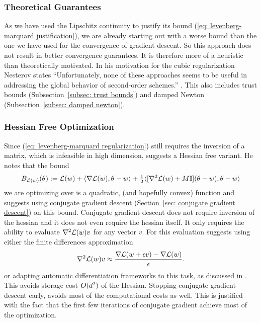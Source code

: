 \subsubsection{Theoretical Guarantees}

As we have used the Lipschitz continuity to justify its bound (\ref{eq:
levenberg-marquard justification}), we are already starting out with a worse
bound than the one we have used for the convergence of gradient descent. So
this approach does not result in better convergence guarantees. It is
therefore more of a heuristic than theoretically motivated. In his motivation
for the cubic regularization Nesterov states ``Unfortunately,
none of these approaches seems to be useful in addressing the global behavior of
second-order schemes.'' \parencite[p. 242]{nesterovLecturesConvexOptimization2018}.
This also includes trust bounds (Subsection~\ref{subsec: trust bounds}) and
damped Newton (Subsection~\ref{subsec: damped newton}).

\subsubsection{Hessian Free Optimization}

Since (\ref{eq: levenberg-marquard regularization}) still requires the inversion
of a matrix, which is infeasible in high dimension,
\textcite{martensDeepLearningHessianfree2010} suggests a Hessian free variant.
He notes that the bound
\begin{align}\label{eq: levenberg-marquard upper bound}
	B_{\mathcal{L}(w)}(\theta) := \mathcal{L}(w) + \langle \nabla\mathcal{L}(w), \theta-w \rangle
	+ \tfrac12\langle [\nabla^2\mathcal{L}(w)+M\mathbb{I}](\theta-w), \theta-w \rangle
\end{align}
we are optimizing over is a quadratic, (and hopefully convex) function and
suggests using conjugate gradient descent (Section~\ref{sec: conjugate gradient
descent}) on this bound. Conjugate gradient descent does not require inversion
of the hessian and it does not even require the hessian itself. It only
requires the ability to evaluate \(\nabla^2\mathcal{L}(w)v\) for any vector
\(v\). For this evaluation \textcite{martensDeepLearningHessianfree2010} suggests
using either the finite differences approximation
\begin{align*}
	\nabla^2\mathcal{L}(w) v
	\approx \frac{\nabla\mathcal{L}(w + \epsilon v) - \nabla\mathcal{L}(w)}{\epsilon}.
\end{align*}
or adapting automatic differentiation frameworks to this task, as discussed in
\textcite{pearlmutterFastExactMultiplication1994}. This avoids storage cost
\(O(d^2)\) of the Hessian. Stopping conjugate gradient descent early,
avoids most of the computational costs as well. This is justified with the fact
that the first few iterations of conjugate gradient achieve most of the
optimization.

